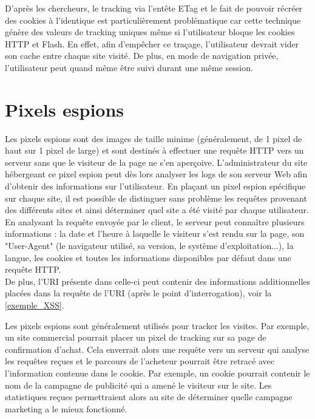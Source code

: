 D'après les chercheurs, le tracking via l'entête ETag et le fait de pouvoir récréer des cookies à l'identique est particulièrement problématique car cette technique génère des valeurs de tracking uniques même si l'utilisateur bloque les cookies HTTP et Flash. En effet, afin d'empêcher ce traçage, l'utilisateur devrait vider son cache entre chaque site visité. De plus, en mode de navigation privée, l'utilisateur peut quand même être suivi durant une même session.

\section{Pixels espions}
Les pixels espions sont des images de taille minime (généralement, de 1 pixel de haut sur 1 pixel de large) et sont destinés à effectuer une requête HTTP vers un serveur sans que le visiteur de la page ne s'en aperçoive. L'administrateur du site hébergeant ce pixel espion peut dès lors analyser les logs de son serveur Web afin d'obtenir des informations sur l'utilisateur. En plaçant un pixel espion spécifique sur chaque site, il est possible de distinguer sans problème les requêtes provenant des différents sites et ainsi déterminer quel site a été visité par chaque utilisateur.
En analysant la requête envoyée par le client, le serveur peut connaître plusieurs informations : la date et l'heure à laquelle le visiteur s'est rendu sur la page, son "User-Agent" (le navigateur utilisé, sa version, le système d'exploitation...), la langue, les cookies et toutes les informations disponibles par défaut dans une requête HTTP.\\
De plus, l'URI présente dans celle-ci peut contenir des informations additionnelles placées dans la requête de l'URI (après le point d'interrogation), voir la \autoref{exemple_XSS}.
\newline

Les pixels espions sont généralement utilisés pour tracker les visites. Par exemple, un site commercial pourrait placer un pixel de tracking sur sa page de confirmation d'achat. Cela enverrait alors une requête vers un serveur qui analyse les requêtes reçues et le parcours de l'acheteur pourrait être retracé avec l'information contenue dans le cookie. Par exemple, un cookie pourrait contenir le nom de la campagne de publicité qui a amené le visiteur sur le site. Les statistiques reçues permettraient alors au site de déterminer quelle campagne marketing a le mieux fonctionné.

